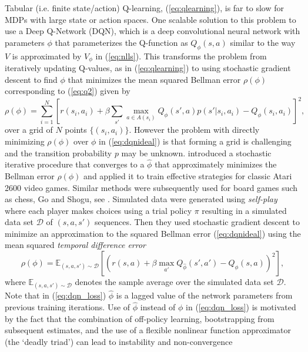 Tabular (i.e. finite state/action) Q-learning, (\ref{eq:qlearning}), is far to slow for MDPs with large state or action spaces. 
One scalable solution to this problem to use a  Deep Q-Network (DQN), which is a deep convolutional neural network with parameters $\phi$ 
that parameterizes the Q-function as $Q_\phi(s,a)$ similar to the way $V$ is approximated by $V_\phi$ in (\ref{eq:nlls}).
This transforms the problem from iteratively updating Q-values, as in (\ref{eq:qlearning})
to using stochastic gradient descent to find $\phi$ that minimizes the mean squared Bellman error $\rho(\phi)$ corresponding to
(\ref{eq:q2})  given by
\begin{equation} 
   \rho(\phi) = \sum_{i=1}^N \left[ r(s_i,a_i)+\beta \sum_{s'} \max_{a \in A(s_i)} Q_\phi(s',a)p(s'|s_i,a_i) - Q_\phi(s_i,a_i)\right]^2,
\label{eq:dqnideal}
\end{equation}
over a grid of $N$ points $\{(s_i,a_i)\}$. However the problem with directly
minimizing $\rho(\phi)$ over $\phi$ in (\ref{eq:dqnideal}) is that forming a grid is challenging and the transition probability
$p$ may be unknown. \citet{mnih:2015} introduced a stochastic iterative procedure that converges to a $\hat\phi$ that
approximately minimizes the Bellman error $\rho(\phi)$ and applied it to train effective strategies
for classic Atari 2600 video games. Similar methods were subsequently used for
board games such as chess, Go and Shogu, see \citet{Silver:2018}. Simulated data were generated using {\it self-play\/} where
each player makes choices using a trial policy $\pi$ resulting in 
a simulated data set $\mathcal{D}$ of $(s,a,s')$ sequences. Then they used  stochastic gradient descent to minimize 
an approximation to the squared Bellman error (\ref{eq:dqnideal}) using the mean squared {\it temporal difference error\/}
\begin{equation}
      \rho(\phi) = \mathbb{E}_{(s,a,s')\sim\mathcal{D}} \left[ \left(r(s,a) + \beta \max_{a'} Q_{\hat\phi}(s', a') - Q_\phi(s, a) \right)^2 \right],
\label{eq:dqn_loss}
\end{equation}
where $\mathbb{E}_{(s,a,s')\sim\mathcal{D}}$ denotes the sample average over the simulated data set $\mathcal{D}$.
Note that in (\ref{eq:dqn_loss}) $\hat\phi$ is a lagged value of the network parameters from
previous training iterations. Use of $\hat\phi$ instead of $\phi$ in (\ref{eq:dqn_loss}) is motivated by the fact that
the combination of off-policy learning, bootstrapping from subsequent estimates, and the use of a 
flexible nonlinear function approximator (the `deadly triad') can lead to instability and non-convergence
